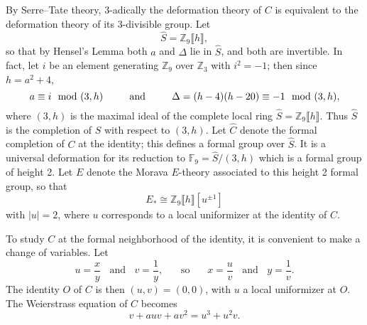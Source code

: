 \documentclass{gtpart}
\theoremstyle{definition}
\theoremstyle{remark}
\newcommand{\mb}[1]{\mathbb{#1}}
\newcommand{\BF}{{\mb F}}
\newcommand{\BZ}{{\mb Z}}
\newcommand{\HC}{\widehat{C}}
\newcommand{\HS}{\widehat{S}}
\newcommand{\md}{~~{\rm mod}~}
\begin{document}
By Serre--Tate theory, 3-adically the deformation theory of $C$ is equivalent to the deformation theory of its 3-divisible group.  
Let 
\[
 \HS = \BZ_9 \llbracket h \rrbracket, 
\]
so that by Hensel's Lemma both $a$ and $\Delta$ lie in $\HS$, and both are invertible.  
In fact, let $i$ be an element generating $\BZ_9$ over $\BZ_3$ with $i^2 = -1$; then since $h = a^2 + 4$, 
\begin{equation}
\label{a}
 a \equiv i \md (3,h)~~~~~~~~\text{and}~~~~~~~~\Delta = (h - 4) (h - 20) \equiv -1 \md (3,h), 
\end{equation}
where $(3,h)$ is the maximal ideal of the complete local ring $\HS = \BZ_9 \llbracket h \rrbracket$.  
Thus $\HS$ is the completion of $S$ with respect to $(3,h)$.  
Let $\HC$ denote the formal completion of $C$ at the identity; this defines a formal group over $\HS$.  
It is a universal deformation for its reduction to $\BF_9 = \HS / (3,h)$ which is a formal group of height 2.  
Let $E$ denote the Morava $E$-theory associated to this height 2 formal group, 
so that 
\[
 E_* \cong \BZ_9 \llbracket h \rrbracket [u^{\pm 1}] 
\]
with $|u| = 2$, where $u$ corresponds to a local uniformizer at the identity of $C$.  

To study $C$ at the formal neighborhood of the identity, it is convenient to make a change of variables.  
Let 
\[
 u = \frac{x}{y}~~~~\text{and}~~~~v = \frac{1}{y},~~~~~~~~\text{so}~~~~~~~~x = \frac{u}{v}~~~~\text{and}~~~~y = \frac{1}{v}.  
\]
The identity $O$ of $C$ is then $(u,v) = (0,0)$, with $u$ a local uniformizer at $O$.  
The Weierstrass equation of $C$ becomes 
\begin{equation}
\label{nf}
 v + a u v + a v^2 = u^3 + u^2 v.  
\end{equation}
\end{document}
